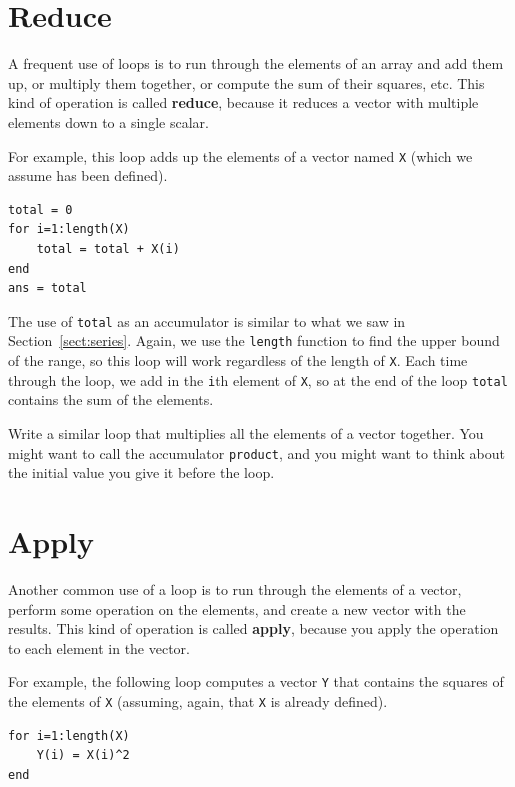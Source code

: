 \documentclass[
]{book}
\begin{document}
\section{Reduce}
\label{sect:reduce}

A frequent use of loops is to run through the elements of an array
and add them up, or multiply them together, or compute the sum
of their squares, etc.  This kind of operation is called {\bf reduce},
because it reduces a vector with multiple elements down to a single
scalar.

For example, this loop adds up the elements of a vector named {\tt X}
(which we assume has been defined).

\begin{verbatim}
total = 0
for i=1:length(X)
    total = total + X(i)
end
ans = total
\end{verbatim}

The use of {\tt total} as an accumulator is similar to what we
saw in Section~\ref{sect:series}.  Again, we use the {\tt length} function
to find the upper bound of the range, so this loop will work
regardless of the length of {\tt X}.
Each time through the loop, we add
in the {\tt i}th element of {\tt X}, so at the end of the loop
{\tt total} contains the sum of the elements.

\begin{ex}
Write a similar loop that multiplies all the
elements of a vector together.  You might want to call the
accumulator {\tt product}, and you might want to think about
the initial value you give it before the loop.
\end{ex}


\section{Apply}
\label{sect:apply}

Another common use of a loop is to run through the elements of
a vector, perform some operation on the elements, and create
a new vector with the results.  This kind of operation is called
{\bf apply}, because you apply the operation to each element in
the vector.

For example, the following loop computes a vector {\tt Y} that
contains the squares of the elements of {\tt X} (assuming, again,
that {\tt X} is already defined).

\begin{verbatim}
for i=1:length(X)
    Y(i) = X(i)^2
end
\end{verbatim}
\end{document}
